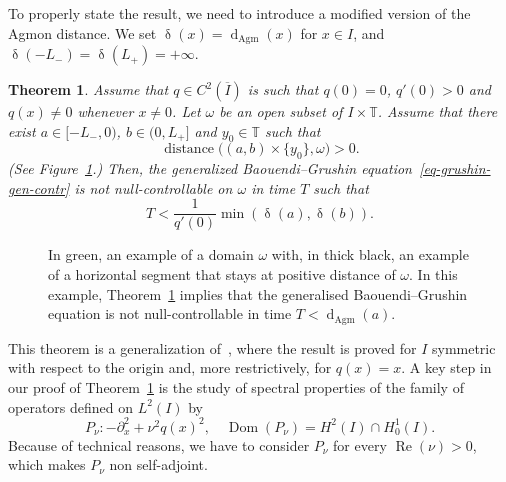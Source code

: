 \documentclass[10pt]{amsart}
\newtheorem{theo}{Theorem}[section]
\theoremstyle{definition}\newtheorem{defi}[theo]{Definition}\newtheorem{rema}[theo]{Remark}\newtheorem{exam}[theo]{Example}\newtheorem{exem}[theo]{Example}\newtheorem{nota}[theo]{Notation}
\newcommand{\1}{\mathds 1}
\DeclareMathOperator{\Ree}{Re}
\DeclareMathOperator{\Dom}{Dom}
\DeclareMathOperator{\distance}{distance}
\newcommand{\dagmon}{\mathop{\mathrm{d}}\nolimits_{\mathrm{Agm}}}
\DeclareMathOperator{\dagmontilde}{\delta}
\newcommand{\T}{\mathbb{T}}
\renewcommand{\o}{\omega}
\begin{document}
To properly state the result, we need to introduce a modified version of the Agmon distance. We set $\dagmontilde(x) = \dagmon(x)$ for $x \in I$, and $\dagmontilde(-L_-) = \dagmontilde(L_+) = +\infty$.



\begin{theo}\label{th-main-neg-intro}
Assume that $q\in C^2(\overline I)$ is such that $q(0) = 0$, $q'(0) > 0$ and $q(x) \neq 0$ whenever $x\neq 0$. Let $\o$ be an open subset of $I\times \T$. Assume that there exist $a \in [-L_-,0)$, $b \in (0,L_+]$ and $y_0 \in \T$ such that
\[
\distance\big((a,b)\times \{y_0\}, \o\big) > 0.
\]
(See Figure~\ref{fig:omega_neg_intro}.) Then, the generalized Baouendi--Grushin equation~\eqref{eq-grushin-gen-contr} is not null-controllable on $\o$ in time $T$ such that
\[
T< \frac{1}{q'(0)}\min \left(\dagmontilde(a),\dagmontilde(b) \right).
\]
\end{theo}

\begin{figure}[ht]
\centering
{}
\caption{In green, an example of a domain $\omega$ with, in thick black, an example of a horizontal segment that stays at positive distance of $\o$. In this example, Theorem~\ref{th-main-neg-intro} implies that the generalised Baouendi--Grushin equation is not null-controllable in time $T<\dagmon(a)$.}\label{fig:omega_neg_intro}
\end{figure}

This theorem is a generalization of~\cite[Theorem~3.3]{DK20}, where the result is proved for $I$ symmetric with respect to the origin and, more restrictively, for $q(x) = x$. A key step in our proof of Theorem~\ref{th-main-neg-intro} is the study of spectral properties of the family of operators defined on $L^2(I)$ by
\begin{equation}\label{eq_def_Pnu}
P_\nu\colon -\partial^2_x + \nu^2 q(x)^2, \quad \Dom(P_\nu) = H^2(I)\cap H^1_0(I).
\end{equation}
Because of technical reasons, we have to consider $P_\nu$ for every $\Ree(\nu)>0$, which makes $P_\nu$ non self-adjoint.
\end{document}
